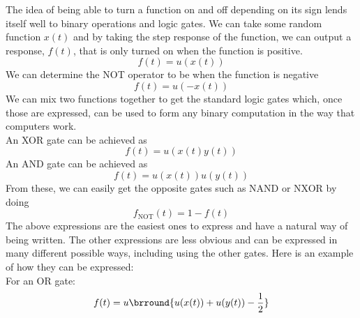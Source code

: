 The idea of being able to turn a function on and off depending on its sign lends itself well to binary operations and logic gates. We can take some random function $x(t)$ and by taking the step response of the function, we can output a response, $f(t)$, that is only turned on when the function is positive.
\[ f(t)=u(x(t)) \]
We can determine the NOT operator to be when the function is negative
\[ f(t)=u(-x(t)) \]
We can mix two functions together to get the standard logic gates which, once those are expressed, can be used to form any binary computation in the way that computers work.\\
An XOR gate can be achieved as
$$f(t)=u(x(t)y(t))$$
An AND gate can be achieved as
$$f(t)=u(x(t))u(y(t))$$
From these, we can easily get the opposite gates such as NAND or NXOR by doing
$$f_\text{NOT}(t)=1-f(t)$$
The above expressions are the easiest ones to express and have a natural way of being written. The other expressions are less obvious and can be expressed in many different possible ways, including using the other gates. Here is an example of how they can be expressed:\\
For an OR gate:
$$f(t)=u\brround{u(x(t))+u(y(t))-\frac{1}{2}}$$